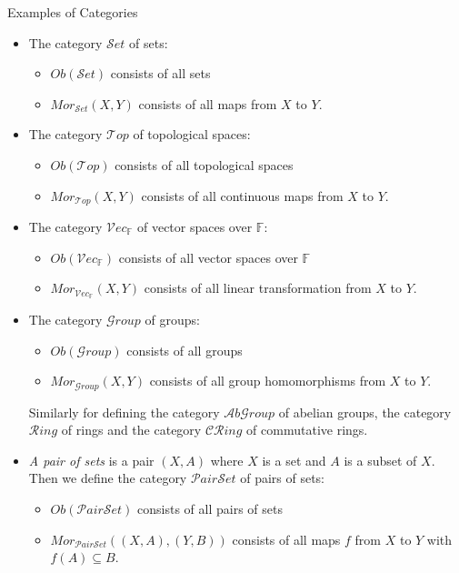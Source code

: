 \begin{definition}{Examples of Categories}\\
\begin{itemize}
    \item The category $\mathcal{S}et$ of sets:
    \begin{itemize}
        \item $Ob(\mathcal{S}et)$ consists of all sets
        \item $Mor_{\mathcal{S}et}(X,Y)$ consists of all maps from $X$ to $Y$.
    \end{itemize}
    
    \item The category $\mathcal{T}op$ of topological spaces:
    \begin{itemize}
        \item $Ob(\mathcal{T}op)$ consists of all topological spaces
        \item $Mor_{\mathcal{T}op}(X,Y)$ consists of all continuous maps from $X$ to $Y$.
    \end{itemize}

    \item The category $\mathcal{V}ec_\mathbb{F}$ of vector spaces over $\mathbb{F}$:
    \begin{itemize}
        \item $Ob(\mathcal{V}ec_\mathbb{F})$ consists of all vector spaces over $\mathbb{F}$
        \item $Mor_{\mathcal{V}ec_{\mathbb{F}}}(X,Y)$ consists of all linear transformation from $X$ to $Y$.
    \end{itemize}

    \item The category $\mathcal{G}roup$ of groups:
    \begin{itemize}
        \item $Ob(\mathcal{G}roup)$ consists of all groups
        \item $Mor_{\mathcal{G}roup}(X,Y)$ consists of all group homomorphisms from $X$ to $Y$.
    \end{itemize}
    Similarly for defining the category $\mathcal{A}b\mathcal{G}roup$ of abelian groups, the category $\mathcal{R}ing$ of rings and the category $\mathcal{CR}ing$ of commutative rings.

    \item \textit{A pair of sets} is a pair $(X,A)$ where $X$ is a set and $A$ is a subset of $X$. Then we define the category $\mathcal{P}air\mathcal{S}et$ of pairs of sets:
    \begin{itemize}
        \item $Ob(\mathcal{P}air\mathcal{S}et)$ consists of all pairs of sets
        \item $Mor_{\mathcal{P}air\mathcal{S}et} ((X,A),(Y,B))$ consists of all maps $f$ from $X$ to $Y$ with $f(A) \subseteq B$.
    \end{itemize}


\end{itemize}
\end{definition}
